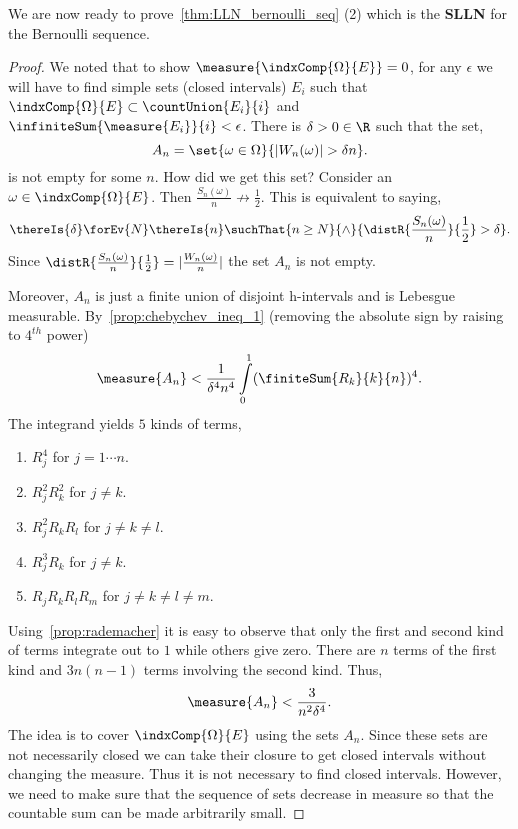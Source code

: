 We are now ready to prove~\ref{thm:LLN_bernoulli_seq} (2) which is the \textbf{SLLN} for the
Bernoulli sequence.
\begin{proof}
    We noted that to show $\measure{\indxComp{\Omega}{E}} = 0$, for any $\epsilon$ 
    we will have to find simple
    sets (closed intervals) $E_i$ such that $\indxComp{\Omega}{E} \subset \countUnion{E_i}{i}$
    and $\infiniteSum{\measure{E_i}}{i} < \epsilon$.
    There is $\delta > 0 \in \R$ such that the set,
    \[A_n = \set{\omega\in\Omega}{\lvert W_n(\omega) \rvert > \delta n}.\]
    is not empty for some $n$.
    How did we get this set? Consider an $\omega \in \indxComp{\Omega}{E}$. Then
    $\frac{S_n(\omega)}{n} \not \to \frac{1}{2}$. This is equivalent to saying,
    \[\thereIs{\delta}\forEv{N}\thereIs{n}\suchThat{n\geq
	    N}{\land}{\distR{\frac{S_n(\omega)}{n}}{\frac{1}{2}} > \delta}.\]
    Since $\distR{\frac{S_n(\omega)}{n}}{\frac{1}{2}} = \lvert 
    \frac{W_n(\omega)}{n}\rvert$ the set $A_n$ is not empty.

    Moreover, $A_n$ is just a finite union of disjoint h-intervals and is Lebesgue measurable.
    By~\ref{prop:chebychev_ineq_1} (removing the absolute sign by raising to $4^{th}$ power)
    \[\measure{A_n} < \frac{1}{{\delta}^4n^4}\int\limits_{0}^1(\finiteSum{R_k}{k}{n})^4.\]	
    The integrand yields $5$ kinds of terms,
    \begin{enumerate}
	\item
	    $R_j^4$ for $j = 1 \cdots n$.
	\item
	    $R_j^2 R_k^2$ for $j\neq k$.
	\item
	    $R_j^2 R_k R_l$ for $j\neq k \neq l$.
	\item
	    $R_j^3 R_k$ for $j \neq k$.
	\item
	    $R_j R_k R_l R_m$ for $j\neq k \neq l \neq m$.
    \end{enumerate}
    Using~\ref{prop:rademacher} it is easy to observe that only the first and second kind of terms integrate
    out to $1$ while others give zero. There  are $n$ terms of the first kind and $3n(n-1)$ terms
    involving the second kind.
    Thus,
    \[\measure{A_n} < \frac{3}{n^2{\delta}^{4}}.\]
    The idea is to cover $\indxComp{\Omega}{E}$ using the sets $A_n$. Since these sets are not
    necessarily closed we can take their closure to get closed intervals without changing the
    measure. Thus it is not necessary to find closed intervals. However, we need to make sure that the
    sequence of sets decrease in measure so that the countable sum can be made arbitrarily small.
    

\end{proof}

